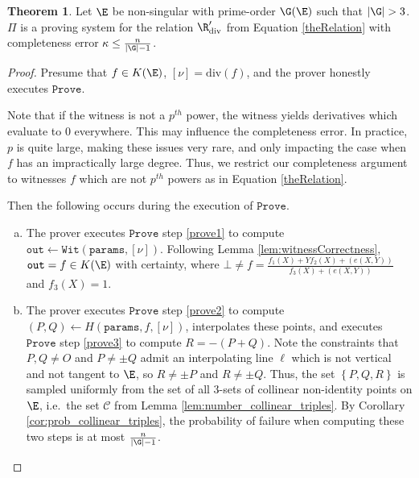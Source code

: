\documentclass[11pt,letterpaper]{article}
\newcommand{\free}[1]{{\textcolor{red}{#1}}}
\theoremstyle{definition}
\newtheorem{theorem}{Theorem}[subsection]
\newcommand{\6}{\mathbf}
\newcommand{\7}{\mathcal}
\begin{document}
\begin{theorem}\label{thm:DivisorCompleteness}
Let $\E$ be non-singular with prime-order $\G(\E)$ such that $\left|\G\right| > 3$. $\Pi$ is a proving system for the relation $\R_{\text{div}}^\prime$ from Equation \ref{theRelation} with completeness error $\kappa \leq \frac{n}{\left|\G\right|-1}$.
\end{theorem}
\begin{proof}
Presume that $f \in K(\E)$, $[\nu] = \text{div}(f)$, and the prover honestly executes $\texttt{Prove}$. 

Note that if the witness is not a $p^{th}$ power, the witness yields  derivatives which evaluate to $0$ everywhere. This may influence the completeness error. In practice, $p$ is quite large, making these issues very rare, and only impacting the case when $f$ has an impractically large degree. Thus, we restrict our completeness argument to witnesses $f$ which are not $p^{th}$ powers as in Equation \ref{theRelation}.

Then the following occurs during the execution of $\texttt{Prove}$.
\begin{enumerate}[(a)]
\item The prover executes $\texttt{Prove}$ step \ref{prove1} to compute $\texttt{out} \leftarrow \texttt{Wit}(\texttt{params},[\nu])$. Following Lemma \ref{lem:witnessCorrectness}, $\texttt{out} = f \in K(\E)$ with certainty, where $\bot \neq f = \frac{f_1(X) + Yf_2(X) + (e(X,Y))}{f_3(X) + (e(X, Y))}$ and $f_3(X) = 1$.

\item The prover executes $\texttt{Prove}$ step \ref{prove2} to compute $(P,Q) \leftarrow H(\texttt{params}, f, [\nu])$, interpolates these points, and executes $\texttt{Prove}$ step \ref{prove3} to compute $R = -(P+Q)$. Note the constraints that $P, Q \neq O$ and $P \neq \pm Q$ admit an interpolating line $\ell$ which is not vertical and not tangent to $\E$, so $R \neq \pm P$ and $R \neq \pm Q$. Thus, the set $\left\{P,Q,R\right\}$ is sampled uniformly from the set of all $3$-sets of  collinear non-identity points on $\E$, i.e.\ the set $\mathcal{C}$ from Lemma \ref{lem:number_collinear_triples}. By Corollary \ref{cor:prob_collinear_triples}, the probability of failure when computing these two steps is at most $\frac{n}{\left|\G\right|-1}$. 



\end{enumerate}
\end{proof}
\end{document}
